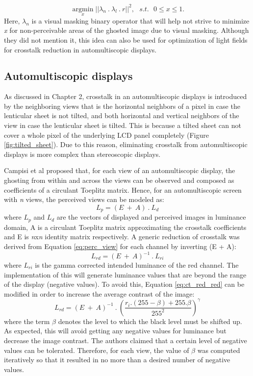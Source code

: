 \begin{equation}
\underset{x}{\operatorname{argmin}}||\lambda_n\:.\:\lambda_l \: . \: r||^2, \:\:\: s.t. \:\:\: 0 \leq x \leq 1.
\label{eq:perc_opt_vm}
\end{equation}
Here, $\lambda_n$ is a visual masking binary operator that will help not strive to minimize \emph{x} for non-perceivable areas of the ghosted image due to visual masking. Although they did not mention it, this idea can also be used for optimization of light fields for crosstalk reduction in automultiscopic displays.

\subsection{Automultiscopic displays}
As discussed in Chapter 2, crosstalk in an automultiscopic displays is introduced by the neighboring views that is the horizontal neighbors of a pixel in case the lenticular sheet is not tilted, and both horizontal and vertical neighbors of the view in case the lenticular sheet is tilted. This is because a tilted sheet can not cover a whole pixel of the underlying LCD panel completely (Figure \ref{fig:tilted_sheet}). Due to this reason, eliminating crosstalk from automultiscopic displays is more complex than stereoscopic displays.

Campisi et al\cite{barkowsky2010crosstalk} proposed that, for each view of an automultiscopic display, the ghosting from within and across the views can be observed and composed as coefficients of a circulant Toeplitz matrix. Hence, for an automultiscopic screen with \emph{n} views, the perceived views can be modeled as:
\begin{equation}
L_p = (E\:+\:A)\:.\:L_d
\label{eq:perc_view}
\end{equation}
where $L_p$ and $L_d$ are the vectors of displayed and perceived images in luminance domain, A is a circulant Toeplitz matrix approximating the crosstalk coefficients and E is \emph{n}x\emph{n} identity matrix respectively. A generic reduction of crosstalk was derived from Equation \ref{eq:perc_view} for each channel by inverting (E + A):
\begin{equation}
L_{rd} = (E\:+\:A)^{-1}\:.\:L_{ri}
\label{eq:ct_red_red}
\end{equation}
where $L_{ri}$ is the gamma corrected intended luminance of the red channel. The implementation of this will generate luminance values that are beyond the range of the display (negative values). To avoid this, Equation \ref{eq:ct_red_red} can be modified in order to increase the average contrast of the image:
\begin{equation}
L_{rd} = (E\:+\:A)^{-1}\:.\:\left(\frac{r_i.(255-\beta)+255.\beta}{255^2}\right)^{\gamma}
\label{eq:ct_red_reduced_contrast}
\end{equation}
where the term $\beta$ denotes the level to which the black level must be shifted up. As expected, this will avoid getting any negative values for luminance but decrease the image contrast. The authors claimed that a certain level of negative values can be tolerated. Therefore, for each view, the value of $\beta$ was computed iteratively so that it resulted in no more than a desired number of negative values.

